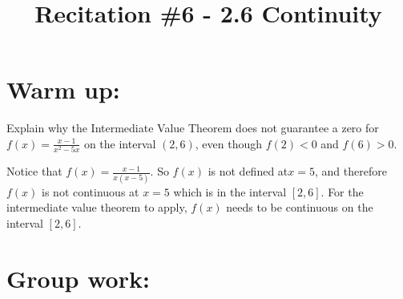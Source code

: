 \documentclass[handout,nooutcomes]{ximera}
\title{Recitation \#6 - 2.6 Continuity}
\begin{document}
\begin{abstract}		\end{abstract}
\maketitle

\section*{Warm up:} 
Explain why the Intermediate Value Theorem does not guarantee a zero for $f(x) = \frac{x-1}{x^2 - 5x}$ on the interval $(2,6)$, even though $f(2) < 0$ and $f(6) > 0$.  

	\begin{freeResponse}
	Notice that $f(x) = \frac{x-1}{x(x-5)}$.  So $f(x)$ is not defined at$x=5$, and therefore $f(x)$ is not continuous at $x=5$ which is in the interval $[2,6]$.  For the intermediate value theorem to apply, $f(x)$ needs to be continuous on the interval $[2,6]$.  
	\end{freeResponse}
	
	

\section*{Group work:}
\end{document}
